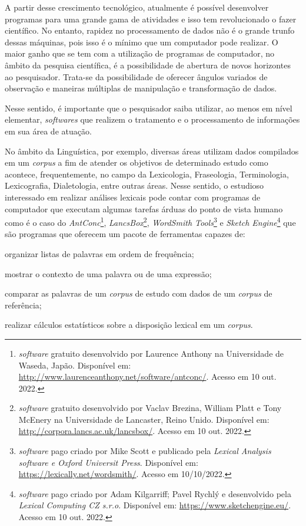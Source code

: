 \documentclass[portuguese]{textolivre}
\begin{document}
A partir desse crescimento tecnológico, atualmente é possível desenvolver programas para uma grande gama de atividades e isso tem revolucionado o fazer científico. No entanto, rapidez no processamento de dados não é o grande trunfo dessas máquinas, pois isso é o mínimo que um computador pode realizar. O maior ganho que se tem com a utilização de programas de computador, no âmbito da pesquisa científica, é a possibilidade de abertura de novos horizontes ao pesquisador. Trata-se da possibilidade  de oferecer ângulos variados de observação e maneiras múltiplas de manipulação e transformação de dados.

Nesse sentido, é importante que o pesquisador saiba utilizar, ao menos em nível elementar, \emph{softwares} que realizem o tratamento e o processamento de informações em sua área de atuação. 

No âmbito da Linguística, por exemplo, diversas áreas utilizam dados compilados em um \textit{corpus} a fim de atender os objetivos de determinado estudo como acontece, frequentemente, no campo da Lexicologia, Fraseologia, Terminologia, Lexicografia, Dialetologia, entre outras áreas. Nesse sentido, o estudioso interessado em realizar análises lexicais pode contar com programas de computador que executam algumas tarefas árduas do ponto de vista humano como é o caso do \emph{AntConc}\footnote{\emph{software} gratuito desenvolvido por Laurence Anthony na Universidade de Waseda, Japão. Disponível em:  \url{http://www.laurenceanthony.net/software/antconc/}. Acesso em 10 out. 2022.},  \emph{LancsBox}\footnote{\emph{software} gratuito desenvolvido por Vaclav Brezina, William Platt e Tony McEnery na Universidade de Lancaster, Reino Unido. Disponível em: \url{http://corpora.lancs.ac.uk/lancsbox/}. Acesso em 10 out. 2022.}, \emph{WordSmith Tools}\footnote{\emph{software} pago criado por Mike Scott e publicado pela \emph{Lexical Analysis software e Oxford Universit Press}.  Disponível em: \url{https://lexically.net/wordsmith/}. Acesso em 10/10/2022.} e \emph{Sketch Engine}\footnote{\emph{software} pago criado por Adam Kilgarriff; Pavel Rychlý e desenvolvido pela \emph{Lexical Computing CZ s.r.o}. Disponível em: \url{https://www.sketchengine.eu/}. Acesso em 10 out. 2022.} que são programas que oferecem um pacote de ferramentas capazes de: 
\begin{enumerate*}[label=\roman*)]
\item organizar listas de palavras em ordem de frequência;  
\item mostrar o contexto de uma palavra ou de uma expressão; 
\item comparar as palavras de um \textit{corpus} de estudo com dados de um \textit{corpus} de referência; 
\item realizar cálculos estatísticos sobre a disposição lexical em um \textit{corpus}. 
\end{enumerate*}
\end{document}
